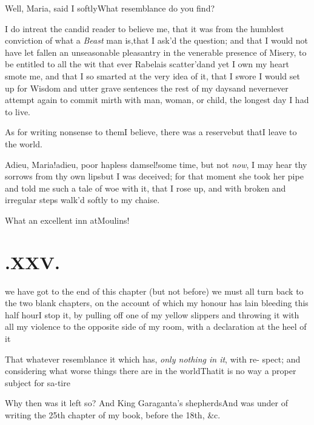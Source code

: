 \documentclass{article}
\begin{document}
\tsh Well, Maria, said I
softly\tsh What resemblance do you find?

I do intreat the candid reader to believe me, that it was from
the humblest conviction of what a \textit{Beast} man
is,\tsh that I ask’d the question; and that I would not
have let fallen an unseasonable pleasantry in the venerable
presence of Misery, to be entitled to all the wit that ever
Rabelais scatter’d\tsh and yet I own my heart
smote me, and that I so smarted at the very idea of it, that I
swore I would set up for Wisdom and utter grave sentences the rest
of my days\tsh and never\tsh\break never attempt again
to commit mirth with man, woman, or child, the longest day I had to
live.

As for writing nonsense to them\tsh\break I believe, there was
a reserve\tsk but that\break I leave to the world.

Adieu, Maria!\tsk adieu, poor hapless
damsel!\tsh some time, but not \textit{now}, I may hear thy sorrows
from thy own lips\break\tsh but I was deceived; for that moment
she took her pipe and told me such a tale of woe with it, that I
rose up, and with broken and irregular steps walk’d softly to
my chaise.

\tsh What an excellent inn at\break Moulins!


\vfill{}\eject
\null{}\baselineskip
\section{.\enspace XXV.}

 we have got to the end of this
chapter (but not before) we must all turn back to the two blank
chapters, on the account of which my honour has lain bleeding this
half hour\break\tsh I stop it, by pulling off one of my yellow
slippers and throwing it with all my violence to the opposite side
of my room, with a declaration at the heel of it\tsh

\tsh That whatever resemblance it 
\etp{} 
which has, \textit{only nothing in it}, with re-\break
spect; and considering what worse things there
are in the world\tsk\!\tsk That\break it is no way a proper subject for
sa-\break tire\tsh

\tsh Why then was it left so? And
King Garagant\sic{}a’s shepherds\tsh And
was under of writing the 25th chapter of my book, before the 18th, \&c.
\end{document}
